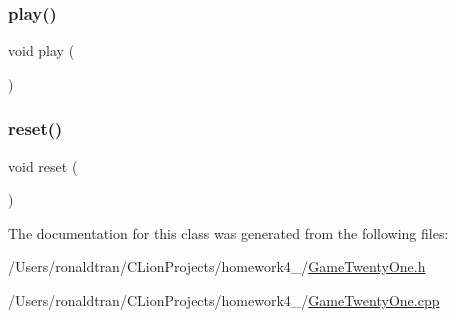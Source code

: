\subsubsection{\texorpdfstring{play()}{play()}}
{\footnotesize\ttfamily void play (\begin{DoxyParamCaption}{ }\end{DoxyParamCaption})}

\mbox{\label{class_game_twenty_one_ad20897c5c8bd47f5d4005989bead0e55}} 
\subsubsection{\texorpdfstring{reset()}{reset()}}
{\footnotesize\ttfamily void reset (\begin{DoxyParamCaption}{ }\end{DoxyParamCaption})}



The documentation for this class was generated from the following files\+:\begin{DoxyCompactItemize}
\item 
/\+Users/ronaldtran/\+C\+Lion\+Projects/homework4\+\_/\mbox{\hyperlink{_game_twenty_one_8h}{Game\+Twenty\+One.\+h}}\item 
/\+Users/ronaldtran/\+C\+Lion\+Projects/homework4\+\_/\mbox{\hyperlink{_game_twenty_one_8cpp}{Game\+Twenty\+One.\+cpp}}\end{DoxyCompactItemize}
